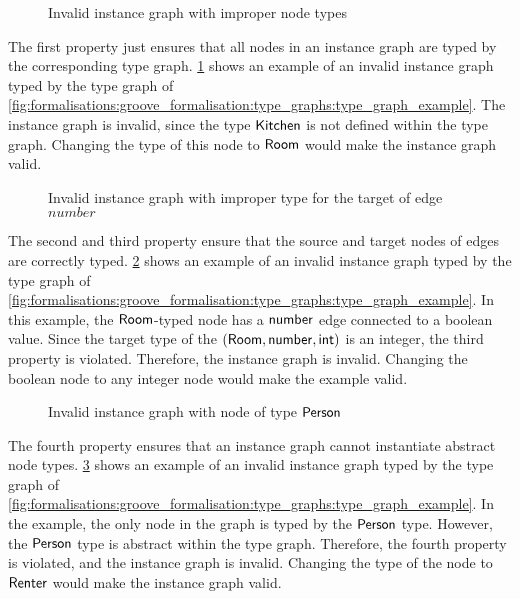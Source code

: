 \begin{figure}[p]
    \centering
    
    \caption{Invalid instance graph with improper node types}
    \label{fig:formalisations:groove_formalisation:instance_graphs:property_1_violated}
\end{figure}

The first property just ensures that all nodes in an instance graph are typed by the corresponding type graph. \cref{fig:formalisations:groove_formalisation:instance_graphs:property_1_violated} shows an example of an invalid instance graph typed by the type graph of \cref{fig:formalisations:groove_formalisation:type_graphs:type_graph_example}. The instance graph is invalid, since the type $\mathsf{Kitchen}$ is not defined within the type graph. Changing the type of this node to $\mathsf{Room}$ would make the instance graph valid.

\begin{figure}[p]
    \centering
    
    \caption{Invalid instance graph with improper type for the target of edge $number$}
    \label{fig:formalisations:groove_formalisation:instance_graphs:property_3_violated}
\end{figure}

The second and third property ensure that the source and target nodes of edges are correctly typed. \cref{fig:formalisations:groove_formalisation:instance_graphs:property_3_violated} shows an example of an invalid instance graph typed by the type graph of \cref{fig:formalisations:groove_formalisation:type_graphs:type_graph_example}. In this example, the $\mathsf{Room}$-typed node has a $\mathsf{number}$ edge connected to a boolean value. Since the target type of the $( \mathsf{Room}, \mathsf{number}, \mathsf{int} )$ is an integer, the third property is violated. Therefore, the instance graph is invalid. Changing the boolean node to any integer node would make the example valid.

\begin{figure}[p]
    \centering
    
    \caption{Invalid instance graph with node of type $\mathsf{Person}$}
    \label{fig:formalisations:groove_formalisation:instance_graphs:property_4_violated}
\end{figure}

The fourth property ensures that an instance graph cannot instantiate abstract node types. \cref{fig:formalisations:groove_formalisation:instance_graphs:property_4_violated} shows an example of an invalid instance graph typed by the type graph of \cref{fig:formalisations:groove_formalisation:type_graphs:type_graph_example}. In the example, the only node in the graph is typed by the $\mathsf{Person}$ type. However, the $\mathsf{Person}$ type is abstract within the type graph. Therefore, the fourth property is violated, and the instance graph is invalid. Changing the type of the node to $\mathsf{Renter}$ would make the instance graph valid.

